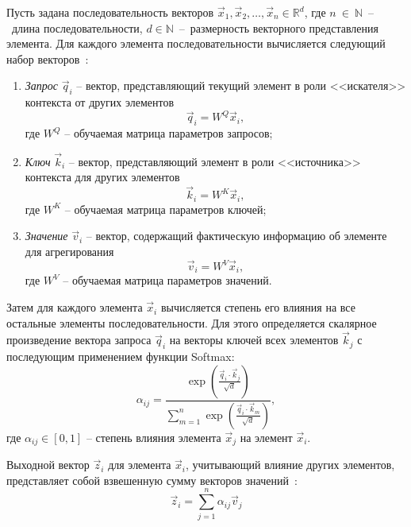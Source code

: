 Пусть задана последовательность векторов $\vec{x}_1, \vec{x}_2, \ldots, \vec{x}_n \in \mathbb{R}^d$, где $n~\in~\mathbb{N}$~--~длина последовательности, $d \in \mathbb{N}$~--~размерность векторного представления элемента. Для каждого элемента последовательности вычисляется следующий набор векторов~\cite{attention}:
\begin{enumerate}
	\item \textit{Запрос} $\vec{q}_i$ -- вектор, представляющий текущий элемент в роли <<искателя>> контекста от других элементов
	\begin{equation}
		\vec{q}_i = W^Q \vec{x}_i,
	\end{equation}
	где $W^Q$ -- обучаемая матрица параметров запросов;
	
	\item \textit{Ключ} $\vec{k}_i$ -- вектор, представляющий элемент в роли <<источника>> контекста для других элементов
	\begin{equation}
		\vec{k}_i = W^K \vec{x}_i,
	\end{equation}
	где $W^K$ -- обучаемая матрица параметров ключей;
	
	\item \textit{Значение} $\vec{v}_i$ -- вектор, содержащий фактическую информацию об элементе для агрегирования
	\begin{equation}
		\vec{v}_i = W^V \vec{x}_i,
	\end{equation}
	где $W^V$ -- обучаемая матрица параметров значений.
\end{enumerate}

Затем для каждого элемента $\vec{x}_i$ вычисляется степень его влияния на все остальные элементы последовательности. Для этого определяется скалярное произведение вектора запроса $\vec{q}_i$ на векторы ключей всех элементов $\vec{k}_j$ с последующим применением функции Softmax:
\begin{equation}
	\alpha_{ij} = \frac{\exp\left( \frac{\vec{q}_i \cdot \vec{k}_j}{\sqrt{d}} \right)}{\sum_{m=1}^n \exp\left( \frac{\vec{q}_i \cdot \vec{k}_m}{\sqrt{d}} \right)},
\end{equation}
где $\alpha_{ij} \in [0,1]$ -- степень влияния элемента $\vec{x}_j$ на элемент $\vec{x}_i$.

Выходной вектор $\vec{z}_i$ для элемента $\vec{x}_i$, учитывающий влияние других элементов,  представляет собой взвешенную сумму векторов значений~\cite{attention}:
\begin{equation}
	\vec{z}_i = \sum_{j=1}^n \alpha_{ij} \vec{v}_j
\end{equation}

